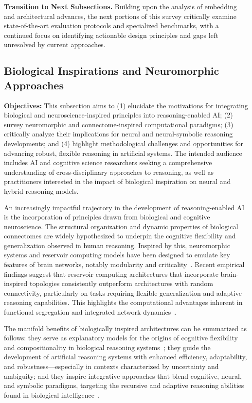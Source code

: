 \documentclass[sigconf]{acmart}
\begin{document}
\textbf{Transition to Next Subsections.} Building upon the analysis of embedding and architectural advances, the next portions of this survey critically examine state-of-the-art evaluation protocols and specialized benchmarks, with a continued focus on identifying actionable design principles and gaps left unresolved by current approaches.

\subsection{Biological Inspirations and Neuromorphic Approaches}

\textbf{Objectives:} This subsection aims to (1) elucidate the motivations for integrating biological and neuroscience-inspired principles into reasoning-enabled AI; (2) survey neuromorphic and connectome-inspired computational paradigms; (3) critically analyze their implications for neural and neural-symbolic reasoning developments; and (4) highlight methodological challenges and opportunities for advancing robust, flexible reasoning in artificial systems. The intended audience includes AI and cognitive science researchers seeking a comprehensive understanding of cross-disciplinary approaches to reasoning, as well as practitioners interested in the impact of biological inspiration on neural and hybrid reasoning models.

An increasingly impactful trajectory in the development of reasoning-enabled AI is the incorporation of principles drawn from biological and cognitive neuroscience. The structural organization and dynamic properties of biological connectomes are widely hypothesized to underpin the cognitive flexibility and generalization observed in human reasoning. Inspired by this, neuromorphic systems and reservoir computing models have been designed to emulate key features of brain networks, notably modularity and criticality~\cite{ref90}. Recent empirical findings suggest that reservoir computing architectures that incorporate brain-inspired topologies consistently outperform architectures with random connectivity, particularly on tasks requiring flexible generalization and adaptive reasoning capabilities. This highlights the computational advantages inherent in functional segregation and integrated network dynamics~\cite{ref90}.

The manifold benefits of biologically inspired architectures can be summarized as follows: they serve as explanatory models for the origins of cognitive flexibility and compositionality in biological reasoning systems~\cite{ref90}; they guide the development of artificial reasoning systems with enhanced efficiency, adaptability, and robustness---especially in contexts characterized by uncertainty and ambiguity; and they inspire integrative approaches that blend cognitive, neural, and symbolic paradigms, targeting the recursive and adaptive reasoning abilities found in biological intelligence~\cite{ref49,ref90}.
\end{document}
